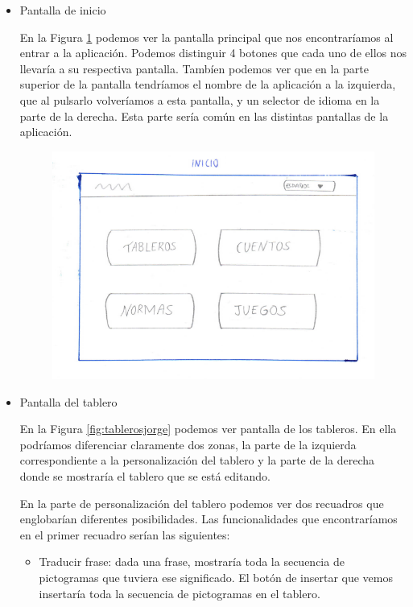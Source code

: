 \begin{itemize}
	\item Pantalla de inicio
	
	En la Figura \ref{fig:iniciojorge} podemos ver la pantalla principal que nos encontraríamos al entrar a la aplicación. Podemos distinguir 4 botones que cada uno de ellos nos llevaría a su respectiva pantalla. 
	Tambíen podemos ver que en la parte superior de la pantalla tendríamos el nombre de la aplicación a la izquierda, que al pulsarlo volveríamos a esta pantalla, y un selector de idioma en la parte de la derecha. Esta parte sería común en las distintas pantallas de la aplicación.
	
	
\begin{figure}[h!]
	\centering
	\includegraphics[width=0.7\linewidth]{Imagenes/Bitmap/inicioJorge}
	\caption{}
	\label{fig:iniciojorge}
\end{figure}

	
	\item Pantalla del tablero
	
	En la Figura \ref{fig:tablerosjorge} podemos ver pantalla de los tableros. En ella podríamos diferenciar claramente dos zonas, la parte de la izquierda correspondiente a la personalización del tablero y la parte de la derecha donde se mostraría el tablero que se está editando.
	
	
	En la parte de personalización del tablero podemos ver dos recuadros que englobarían diferentes posibilidades. Las funcionalidades que encontraríamos en el primer recuadro serían las siguientes:
	
	\begin{itemize}
		\item Traducir frase: dada una frase, mostraría toda la secuencia de pictogramas que tuviera ese significado. El botón de insertar que vemos insertaría toda la secuencia de pictogramas en el tablero.
		

\end{itemize}
\end{itemize}
